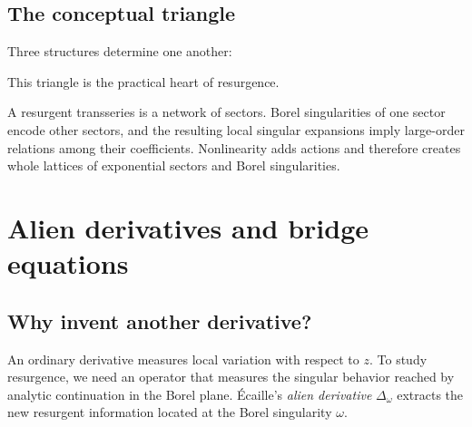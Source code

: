 \documentclass[11pt,oneside]{book}
\theoremstyle{definition}
\theoremstyle{remark}
\begin{document}
\section{The conceptual triangle}

Three structures determine one another:
\begin{center}
\end{center}
This triangle is the practical heart of resurgence.

\begin{summarybox}
A resurgent transseries is a network of sectors. Borel singularities of one
sector encode other sectors, and the resulting local singular expansions imply
large-order relations among their coefficients. Nonlinearity adds actions and
therefore creates whole lattices of exponential sectors and Borel singularities.
\end{summarybox}


\chapter{Alien derivatives and bridge equations}
\label{ch:alien-calculus}

\section{Why invent another derivative?}

An ordinary derivative measures local variation with respect to $z$. To study
resurgence, we need an operator that measures the singular behavior reached by
analytic continuation in the Borel plane. \'Ecaille's \emph{alien derivative}
$\Delta_\omega$ extracts the new resurgent information located at the Borel
singularity $\omega$.
\end{document}
